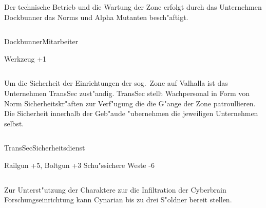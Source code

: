 \vfill
\pagebreak


\begin{column}[l]{0.45}
    Der technische Betrieb und die Wartung der Zone erfolgt durch das Unternehmen Dockbunner das Norms und Alpha Mutanten 
    besch"aftigt.
\end{column}
\begin{column}[r]{0.45}
    \begin{nscsheet}[h]{Dockbunner\newline{}Mitarbeiter}
        \nscstats[ATT=2,AGG=2,EMP=3,KNO=5,HP=10]
        \nscruler
        \begin{nscinventory}
            \nscitem[Waffen] Werkzeug +1
        \end{nscinventory}
    \end{nscsheet}
\end{column}    


\begin{column}[l]{0.45}
    Um die Sicherheit der Einrichtungen der sog.~Zone auf Valhalla ist das Unternehmen TransSec zust"andig. TransSec stellt
    Wachpersonal in Form von Norm Sicherheitskr"aften zur Verf"ugung die die G"ange der Zone patroullieren. Die Sicherheit
    innerhalb der Geb"aude "ubernehmen die jeweiligen Unternehmen selbst.
\end{column}
\begin{column}[r]{0.45}
    \begin{nscsheet}[h]{TransSec\newline{}Sicherheitsdienst}
        \nscstats[ATT=3,AGG=3,EMP=2,KNO=4,HP=10]
        \nscruler
        \begin{nscinventory}
            \nscitem[Waffen] Railgun +5, Boltgun +3
            \nscitem[R"ustung] Schu"ssichere Weste -6           
        \end{nscinventory}
    \end{nscsheet}
\end{column}        


Zur Unterst"utzung der Charaktere zur die Infiltration der Cyberbrain Forschungseinrichtung kann Cynarian bis zu 
drei S"oldner bereit stellen.


